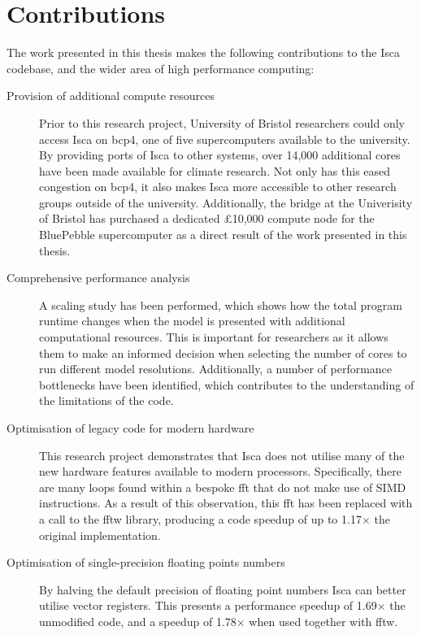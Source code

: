 \documentclass[a4paper,11pt]{report}
\begin{document}
\section{Contributions}
The work presented in this thesis makes the following contributions to the Isca codebase, and the wider area of high performance computing:
\begin{description}
	\item[Provision of additional compute resources] Prior to this research project, University of Bristol researchers could only access Isca on \gls{bcp4}, one of five supercomputers available to the university. By providing ports of Isca to other systems, over 14,000 additional cores have been made available for climate research. Not only has this eased congestion on \gls{bcp4}, it also makes Isca more accessible to other research groups outside of the university. Additionally, the \gls{bridge} at the Univerisity of Bristol has purchased a dedicated £10,000 compute node for the BluePebble supercomputer as a direct result of the work presented in this thesis. 

	\item[Comprehensive performance analysis] A scaling study has been performed, which shows how the total program runtime changes when the model is presented with additional computational resources. This is important for researchers as it allows them to make an informed decision when selecting the number of cores to run different model resolutions. Additionally, a number of performance bottlenecks have been identified, which contributes to the understanding of the limitations of the code. 
	
	\item[Optimisation of legacy code for modern hardware] This research project demonstrates that Isca does not utilise many of the new hardware features available to modern processors. Specifically, there are many loops found within a bespoke \gls{fft} that do not make use of SIMD instructions. As a result of this observation, this \gls{fft} has been replaced with a call to the \gls{fftw} library, producing a code speedup of up to 1.17$\times$ the original implementation.
	
	\item[Optimisation of single-precision floating points numbers] By halving the default precision of floating point numbers Isca can better utilise vector registers. This presents a performance speedup of 1.69$\times$ the unmodified code, and a speedup of 1.78$\times$ when used together with \gls{fftw}. 
	

\end{description}
\end{document}

